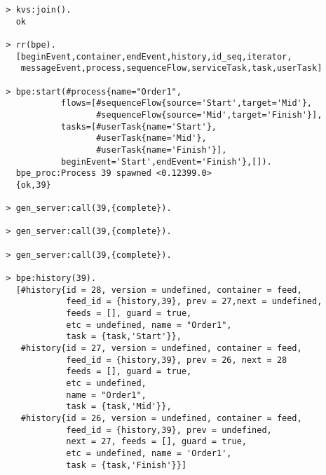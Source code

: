 \vspace{1\baselineskip}
\begin{lstlisting}
  > kvs:join().
    ok

  > rr(bpe).
    [beginEvent,container,endEvent,history,id_seq,iterator,
     messageEvent,process,sequenceFlow,serviceTask,task,userTask]

  > bpe:start(#process{name="Order1",
             flows=[#sequenceFlow{source='Start',target='Mid'},
                    #sequenceFlow{source='Mid',target='Finish'}],
             tasks=[#userTask{name='Start'},
                    #userTask{name='Mid'},
                    #userTask{name='Finish'}],
             beginEvent='Start',endEvent='Finish'},[]).
    bpe_proc:Process 39 spawned <0.12399.0>
    {ok,39}

  > gen_server:call(39,{complete}).

  > gen_server:call(39,{complete}).

  > gen_server:call(39,{complete}).

  > bpe:history(39).
    [#history{id = 28, version = undefined, container = feed,
              feed_id = {history,39}, prev = 27,next = undefined,
              feeds = [], guard = true,
              etc = undefined, name = "Order1",
              task = {task,'Start'}},
     #history{id = 27, version = undefined, container = feed,
              feed_id = {history,39}, prev = 26, next = 28
              feeds = [], guard = true,
              etc = undefined,
              name = "Order1",
              task = {task,'Mid'}},
     #history{id = 26, version = undefined, container = feed,
              feed_id = {history,39}, prev = undefined,
              next = 27, feeds = [], guard = true,
              etc = undefined, name = 'Order1',
              task = {task,'Finish'}}]
\end{lstlisting}

